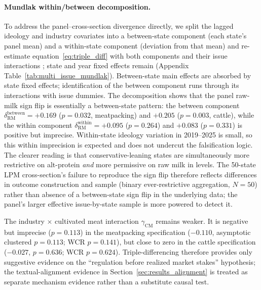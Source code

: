 \documentclass[12pt]{article}
\begin{document}
\paragraph{Mundlak within/between decomposition.}  To address the panel--cross-section divergence directly, we split the lagged ideology and industry covariates into a between-state component (each state's panel mean) and a within-state component (deviation from that mean) and re-estimate equation~\eqref{eq:triple_diff} with both components and their issue interactions \citep{mundlak1978pooling}; state and year fixed effects remain (Appendix Table~\ref{tab:multi_issue_mundlak}).  Between-state main effects are absorbed by state fixed effects; identification of the between component runs through its interactions with issue dummies.  The decomposition shows that the panel raw-milk sign flip is essentially a between-state pattern: the between component $\delta_{\mathrm{RM}}^{\mathrm{between}}=+0.169$ ($p=0.032$, meatpacking) and $+0.205$ ($p=0.003$, cattle), while the within component $\delta_{\mathrm{RM}}^{\mathrm{within}}=+0.095$ ($p=0.264$) and $+0.083$ ($p=0.331$) is positive but imprecise.  Within-state ideology variation in 2019--2025 is small, so this within imprecision is expected and does not undercut the falsification logic.  The clearer reading is that conservative-leaning states are simultaneously more restrictive on alt-protein \emph{and} more permissive on raw milk in levels.  The 50-state LPM cross-section's failure to reproduce the sign flip therefore reflects differences in outcome construction and sample (binary ever-restrictive aggregation, $N=50$) rather than absence of a between-state sign flip in the underlying data; the panel's larger effective issue-by-state sample is more powered to detect it.

The industry $\times$ cultivated meat interaction $\gamma_{\mathrm{CM}}$ remains weaker.  It is negative but imprecise ($p=0.113$) in the meatpacking specification ($-0.110$, asymptotic clustered $p=0.113$; WCR $p=0.141$), but close to zero in the cattle specification ($-0.027$, $p=0.636$; WCR $p=0.624$).  Triple-differencing therefore provides only suggestive evidence on the ``regulation before realized market stakes'' hypothesis; the textual-alignment evidence in Section~\ref{sec:results_alignment} is treated as separate mechanism evidence rather than a substitute causal test.
\end{document}
